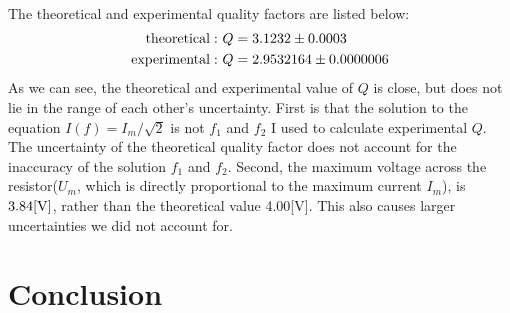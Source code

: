 \documentclass{my_template}
\begin{document}
    \paragraph{} The theoretical and experimental quality factors are listed below:
    \begin{equation*}
        \begin{split}
            {\rm theoretical}:\ &Q=3.1232\pm 0.0003\\
            {\rm experimental}:\ &Q=2.9532164\pm 0.0000006\\
        \end{split}
    \end{equation*}
    As we can see, the theoretical and experimental value of $Q$ is close, but does not lie in the range of each other's uncertainty. First is that the solution to the equation $I(f)=I_m/\sqrt{2}$ is not $f_1$ and $f_2$ I used to calculate experimental $Q$. The uncertainty of the theoretical quality factor does not account for the inaccuracy of the solution $f_1$ and $f_2$. Second, the maximum voltage across the resistor($U_m$, which is directly proportional to the maximum current $I_m$), is $3.84[\rm V]$, rather than the theoretical value 4.00[V]. This also causes larger uncertainties we did not account for.
    \section{Conclusion}
\end{document}
